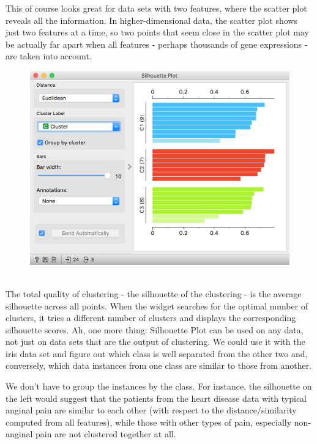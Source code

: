This of course looks great for data sets with two features, where the scatter plot reveals all the information. In higher-dimensional data, the scatter plot shows just two features at a time, so two points that seem close in the scatter plot may be actually far apart when all features - perhaps thousands of gene expressions - are taken into account. 

\begin{figure}[h!]
    \centering
    \includegraphics[width=\linewidth]{silhouette-outliers.png}
    \caption{$\;$} %
\end{figure}

\newpage

The total quality of clustering - the silhouette of the clustering - is the average silhouette across all points. When the  widget searches for the optimal number of clusters, it tries a different number of clusters and displays the corresponding silhouette scores.
Ah, one more thing: Silhouette Plot can be used on any data, not just on data sets that are the output of clustering. We could use it with the iris data set and figure out which class is well separated from the other two and, conversely, which data instances from one class are similar to those from another.

We don't have to group the instances by the class. For instance, the silhouette on the left would suggest that the patients from the heart disease data with typical anginal pain are similar to each other (with respect to the distance/similarity computed from all features), while those with other types of pain, especially non-anginal pain are not clustered together at all.

